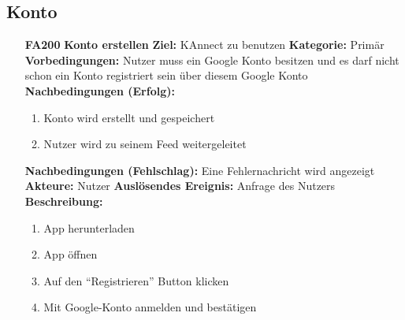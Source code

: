 \documentclass[parskip=full]{scrartcl}
\begin{document}
		\subsection{Konto}
		\begin{itemize}[nosep]
			
			\item[\textbf{FA200}]\textbf{Konto erstellen}
							\newline \textbf{Ziel:} KAnnect zu benutzen
							\newline \textbf{Kategorie:} Primär
							\newline \textbf{Vorbedingungen:} Nutzer muss ein Google Konto besitzen und es darf nicht schon ein Konto registriert sein über diesem Google Konto
							\newline \textbf{Nachbedingungen (Erfolg):} 
							\begin{enumerate}[nosep]
								\item Konto wird erstellt und gespeichert
								\item Nutzer wird zu seinem \gls{Feed} weitergeleitet 
							\end{enumerate}
							\textbf{Nachbedingungen (Fehlschlag):} Eine Fehlernachricht wird angezeigt
							\newline \textbf{Akteure:} Nutzer
							\newline \textbf{Auslösendes Ereignis:} Anfrage des Nutzers
							\newline \textbf{Beschreibung:}
							\begin{enumerate}[nosep]
								\item App herunterladen
								\item App öffnen
								\item Auf den “Registrieren” Button klicken
								\item Mit Google-Konto anmelden und bestätigen\\
							\end{enumerate}
		

\end{itemize}
\end{document}
